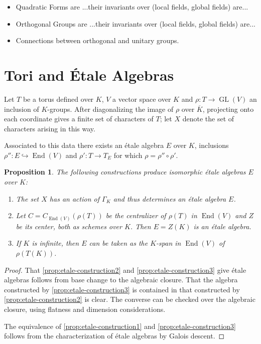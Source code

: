 \documentclass{article}
\theoremstyle{plain}
\newtheorem{proposition}[theorem]{Proposition}
\theoremstyle{definition}
\DeclareMathOperator{\End}{End}
\DeclareMathOperator{\GL}{GL}
\newcommand{\GalKbK}{\Gamma_K}
\newcommand{\Kb}{\overline{K}}
\begin{document}
\begin{itemize}
 





\item Quadratic Forms are ...their invariants over (local fields, global fields) are...
\item Orthogonal Groups are ...their invariants over (local fields, global fields) are...
\item Connections between orthogonal and unitary groups.
\end{itemize}


\section{Tori and \'Etale Algebras}

Let $T$ be a torus defined over $K$, $V$ a vector space over $K$ and $\rho : T \rightarrow \GL(V)$ an inclusion of $K$-groups.  After diagonalizing the image of $\rho$ over $\Kb$, projecting onto each coordinate gives a finite set of characters of $T$; let $X$ denote the set of characters arising in this way. 

Associated to this data there exists an \'etale algebra $E$ over $K$, inclusions $\rho'' : E \hookrightarrow \End(V)$ and $\rho' : T \rightarrow T_E$ for which $\rho = \rho''\circ\rho'$.

\begin{proposition} \label{prop:etale-construction}
The following constructions produce isomorphic \'etale algebras $E$ over $K$:
\begin{enumerate}
\item \label{prop:etale-construction1} The set $X$ has an action of $\GalKbK$ and thus determines an \'etale algebra $E$.
\item \label{prop:etale-construction2} Let $C = C_{\End(V)}(\rho(T))$ be the centralizer of $\rho(T)$ in $\End(V)$ and $Z$ be its center, both as schemes over $K$.  Then $E = Z(K)$ is an \'etale algebra.
\item \label{prop:etale-construction3} If $K$ is infinite, then $E$ can be taken as the $K$-span in $\End(V)$ of $\rho(T(K))$.
\end{enumerate}
\end{proposition}
\begin{proof}
That \eqref{prop:etale-construction2} and \eqref{prop:etale-construction3} give \'etale algebras follows from base change to the algebraic closure.
That the algebra constructed by \eqref{prop:etale-construction3} is contained in that constructed by \eqref{prop:etale-construction2} is clear.
The converse can be checked over the algebraic closure, using flatness and dimension considerations.

The equivalence of \eqref{prop:etale-construction1} and \eqref{prop:etale-construction3} follows from the characterization of \'etale algebras by Galois descent.
\end{proof}
\end{document}
